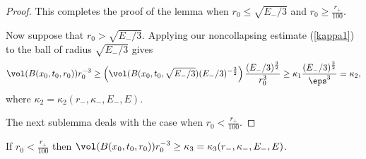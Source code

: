 \begin{proof}
This completes the proof of the lemma when
$r_0\leq \sqrt{E_-/3}$
and $r_0\geq \frac{r_+}{100}$.

Now suppose that $r_0>\sqrt{E_-/3}$.  Applying our
noncollapsing estimate (\ref{kappa1}) to the ball of radius
$\sqrt{E_-/3}$ gives
\begin{equation}
\vol(B(x_0,t_0,r_0))r_0^{-3}\geq \left(\vol(B(x_0,t_0,\sqrt{E_-/3}) (E_-/3)^{-\frac32}
\right)\frac{(E_-/3)^{\frac32}}{r_0^3}
\geq \kappa_1\frac{(E_-/3)^{\frac32}}{\eps^3}=\kappa_2,
\end{equation}
where $\kappa_2=\kappa_2(r_-,\kappa_-,E_-,E)$.

The next sublemma deals with the case when $r_0< \frac{r_+}{100}$.
\end{proof}
\begin{lemma}
  \label{lem:kl-establishing-noncollapsing-presence-surgery-kappa-solutions-lemma}

\label{r0/100}
If $r_0< \frac{r_+}{100}$ then $\vol(B(x_0,t_0,r_0))r_0^{-3}\geq
\kappa_3=\kappa_3(r_-,\kappa_-,E_-,E)$.
\end{lemma}
